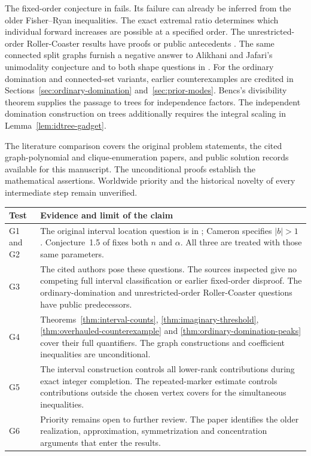 \documentclass[11pt,a4paper]{article}
\begin{document}
The fixed-order conjecture in \cite[Conjecture~1.5]{levitroller} fails. Its failure can already be inferred from the older Fisher--Ryan inequalities. The exact extremal ratio determines which individual forward increases are possible at a specified order. The unrestricted-order Roller-Coaster results have proofs or public antecedents \cite{cutlerpebody,prismroller}. The same connected split graphs furnish a negative answer to Alikhani and Jafari’s unimodality conjecture \cite[Conjecture~2.9]{alijafari} and to both shape questions in \cite[Open Problem~4]{shao}. For the ordinary domination and connected-set variants, earlier counterexamples are credited in Sections~\ref{sec:ordinary-domination} and~\ref{sec:prior-modes}. Bencs's divisibility theorem supplies the passage to trees for independence factors. The independent domination construction on trees additionally requires the integral scaling in Lemma~\ref{lem:idtree-gadget}.

The literature comparison covers the original problem statements, the cited graph-polynomial and clique-enumeration papers, and public solution records available for this manuscript. The unconditional proofs establish the mathematical assertions. Worldwide priority and the historical novelty of every intermediate step remain unverified.

\begin{center}
\small\begin{tabularx}{\linewidth}{@{}p{24mm}X@{}}
\toprule
Test & Evidence and limit of the claim\\
\midrule
G1 and G2 & The original interval location question is in \cite[p.~281]{brown2004}; Cameron specifies $|b|>1$ \cite{cameronweb}. Conjecture~1.5 of \cite{levitroller} fixes both $n$ and $\alpha$. All three are treated with those same parameters.\\[2pt]
G3 & The cited authors pose these questions. The sources inspected give no competing full interval classification or earlier fixed-order disproof. The ordinary-domination and unrestricted-order Roller-Coaster questions have public predecessors.\\[2pt]
G4 & Theorems~\ref{thm:interval-counts}, \ref{thm:imaginary-threshold}, \ref{thm:overhauled-counterexample} and \ref{thm:ordinary-domination-peaks} cover their full quantifiers. The graph constructions and coefficient inequalities are unconditional.\\[2pt]
G5 & The interval construction controls all lower-rank contributions during exact integer completion. The repeated-marker estimate controls contributions outside the chosen vertex covers for the simultaneous inequalities.\\[2pt]
G6 & Priority remains open to further review. The paper identifies the older realization, approximation, symmetrization and concentration arguments that enter the results.\\
\bottomrule
\end{tabularx}
\end{center}
\end{document}
